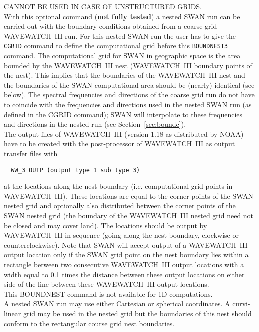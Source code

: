 \documentclass[12pt]{book}
\begin{document}
\noindent
CANNOT BE USED IN CASE OF \underline{UNSTRUCTURED GRIDS}.
\\[2ex]
\noindent
With this optional command ({\bf not fully tested}) a nested SWAN run can be carried out with the boundary
conditions obtained from a coarse grid WAVEWATCH~III run. For this nested SWAN run the user has to
give the {\tt CGRID} command to define the computational grid before this {\tt BOUNDNEST3} command. The
computational grid for SWAN in geographic space is the area bounded by the WAVEWATCH~III nest
(WAVEWATCH~III boundary points of the nest). This implies that the boundaries of the WAVEWATCH~III nest
and the boundaries of the SWAN computational area should be (nearly) identical (see below). The
spectral frequencies and directions of the coarse grid run do not have to coincide with the frequencies
and directions used in the nested SWAN run (as defined in the CGRID command); SWAN will interpolate
to these frequencies and directions in the nested run (see Section~\ref{sec:boundc}).
\\[2ex]
\noindent
The output files of WAVEWATCH~III (version 1.18 as distributed by NOAA) have to be created with the post-processor
of WAVEWATCH~III as output transfer files with
\begin{verbatim}
  WW_3 OUTP (output type 1 sub type 3)
\end{verbatim}
at the locations along the nest boundary  (i.e. computational grid points in WAVEWATCH~III). These
locations are equal to the corner points of the SWAN nested grid and optionally also distributed between
the corner points of the SWAN nested grid (the boundary of the WAVEWATCH~III nested grid need not be
closed and may cover land). The locations should be output by WAVEWATCH~III in sequence (going along
the nest boundary, clockwise or counterclockwise). Note that SWAN will accept output of  a
WAVEWATCH~III output location only if the SWAN grid point on the nest boundary lies within a rectangle
between two consecutive WAVEWATCH~III output locations with a width equal to 0.1 times the distance
between these output locations on either side of the line between these WAVEWATCH~III output locations.
\\[2ex]
\noindent
This BOUNDNEST command is not available for 1D computations.
\\[2ex]
\noindent
A nested SWAN run may use either Cartesian or spherical coordinates. A curvi-linear grid may be used
in the nested grid but the boundaries of this nest should conform to the rectangular course grid nest
boundaries.
\end{document}
